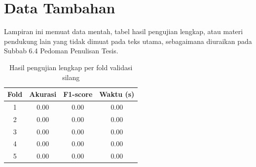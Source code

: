 \chapter{Data Tambahan}

Lampiran ini memuat data mentah, tabel hasil pengujian lengkap, atau materi pendukung lain yang tidak dimuat pada teks utama, sebagaimana diuraikan pada Subbab 6.4 Pedoman Penulisan Tesis.

\begin{table}[H]
\centering
\caption{Hasil pengujian lengkap per fold validasi silang}
\label{tab:lampiran-hasil-lengkap}
\begin{tabular}{|c|c|c|c|}
\hline
Fold & Akurasi & F1-score & Waktu (s) \\
\hline
1 & 0.00 & 0.00 & 0.00 \\
\hline
2 & 0.00 & 0.00 & 0.00 \\
\hline
3 & 0.00 & 0.00 & 0.00 \\
\hline
4 & 0.00 & 0.00 & 0.00 \\
\hline
5 & 0.00 & 0.00 & 0.00 \\
\hline
\end{tabular}
\end{table}
